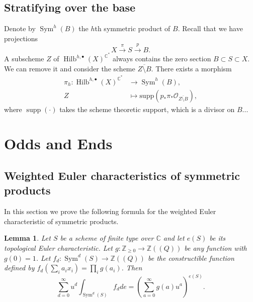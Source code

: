 \documentclass{amsart}
\newtheorem{lemma}[theorem]{Lemma}
\theoremstyle{definition}
\newcommand{\CC} {\mathbb{C}}          %
\newcommand{\ZZ} {\mathbb{Z}}		%
\renewcommand{\O}{\mathcal{O}}
\newcommand{\Sym}{\operatorname{Sym}}
\newcommand{\Hilb}{\operatorname{Hilb}}
\newcommand{\supp}{\operatorname{supp}}
\begin{document}
\subsection{Stratifying over the base} Denote by $\Sym^h(B)$ the $h$th symmetric product of $B$. Recall that we have projections 
$$
X \stackrel{\pi}{\longrightarrow} S \stackrel{p}{\longrightarrow} B.
$$
A subscheme $Z$ of $ \Hilb^{h,\bullet}(X)^{\CC^*}$ always contains the zero section $B \subset S \subset X$. We can remove it and consider the scheme $\overline{Z \setminus B}$. There exists a morphism
\begin{align*}
\pi_{h} : \Hilb^{h,\bullet}(X)^{\CC^*} &\longrightarrow \Sym^h(B), \\
Z &\mapsto \mathrm{supp}( p_* \pi_* \O_{\overline{Z \setminus B}} ),
\end{align*}
where $\supp(\cdot)$ takes the scheme theoretic support, which is a divisor on $B$... 
   

\appendix
\section{Odds and Ends}\label{appendix: odds and ends}


\subsection{Weighted Euler characteristics of symmetric products}

In this section we prove the following formula for the weighted Euler
characteristic of symmetric products.

\begin{lemma}\label{lem: formula for euler char of sym products}
Let $S$ be a scheme of finite type over $\CC $ and let $e (S)$ be its
topological Euler characteristic. Let $g:\ZZ _{\geq 0}\to \ZZ ((Q))$
be any function with $g (0)=1$. Let $f_{d}:\Sym ^{d} (S)\to \ZZ ((Q))$
be the constructible function defined by $f_{d} (\sum_{i}
a_{i}x_{i})=\prod _{i}g (a_{i})$. Then
\[
\sum _{d=0}^{\infty } u^{d} \int _{\Sym ^{d} (S)} f_{d} de =
\left(\sum _{a=0}^{\infty }g (a) u^{a} \right)^{e (S)}.
\]
\end{lemma}
\end{document}
